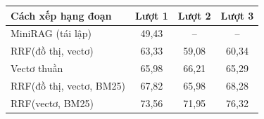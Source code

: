 \begin{tabular}{lccc}
\toprule
Cách xếp hạng đoạn & Lượt 1 & Lượt 2 & Lượt 3 \\
\midrule
MiniRAG (tái lập) & 49{,}43 & -- & -- \\
RRF(đồ thị, vectơ) & 63{,}33 & 59{,}08 & 60{,}34 \\
Vectơ thuần & 65{,}98 & 66{,}21 & 65{,}29 \\
RRF(đồ thị, vectơ, BM25) & 67{,}82 & 65{,}98 & 68{,}28 \\
RRF(vectơ, BM25) & 73{,}56 & 71{,}95 & 76{,}32 \\
\bottomrule
\end{tabular}
